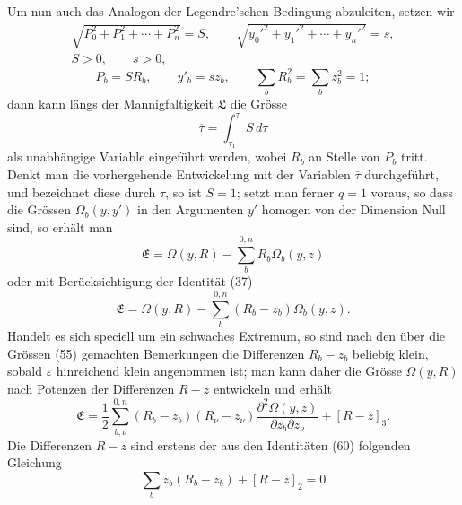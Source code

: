 \documentclass[11pt,a4paper,leqno]{article}
\begin{document}
Um nun auch das Analogon der Legendre'schen Bedingung abzuleiten,
setzen wir
\[
\begin{gathered}
\sqrt{P_0^2+P_1^2+\cdots+P_n^2}=S,\qquad
\sqrt{y_0'^2+y_1'^2+\cdots+y_n'^2}=s,\\
S>0,\qquad s>0,
\end{gathered}
\]
\begin{equation}\tag{60}
P_b=SR_b,\qquad y'_b=sz_b,\qquad
\sum_bR_b^2=\sum_bz_b^2=1;
\end{equation}
dann kann längs der Mannigfaltigkeit $\mathfrak{L}$ die Grösse
\[
\overline{\tau}=\int_{\tau_1}^{\tau}S\,d\tau
\]
als unabhängige Variable eingeführt werden, wobei $R_b$ an Stelle von
$P_b$ tritt. Denkt man die vorhergehende Entwickelung mit der Variablen
$\overline{\tau}$ durchgeführt, und bezeichnet diese durch $\tau$, so
ist $S=1$; setzt man ferner $q=1$ voraus, so dass die Grössen
$\Omega_b(y,y')$ in den Argumenten $y'$ homogen von der Dimension Null
sind, so erhält man
\begin{equation}\tag{61}
\mathfrak{E}=\Omega(y,R)-\sum_b^{0,n}R_b\Omega_b(y,z)
\end{equation}
oder mit Berücksichtigung der Identität (37)
\[
\mathfrak{E}=\Omega(y,R)-\sum_b^{0,n}(R_b-z_b)\Omega_b(y,z).
\]
Handelt es sich speciell um ein schwaches Extremum, so sind nach den
über die Grössen (55) gemachten Bemerkungen die Differenzen $R_b-z_b$
beliebig klein, sobald $\varepsilon$ hinreichend klein angenommen ist;
man kann daher die Grösse $\Omega(y,R)$ nach Potenzen der Differenzen
$R-z$ entwickeln und erhält
\[
\mathfrak{E}=\frac12\sum_{b,\nu}^{0,n}(R_b-z_b)(R_\nu-z_\nu)
\frac{\partial^2\Omega(y,z)}{\partial z_b\partial z_\nu}+[R-z]_3.
\]
Die Differenzen $R-z$ sind erstens der aus den Identitäten (60)
folgenden Gleichung
\begin{equation}\tag{62}
\sum_b z_b(R_b-z_b)+[R-z]_2=0
\end{equation}
\end{document}
